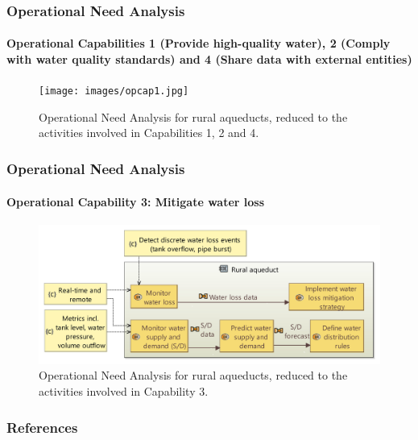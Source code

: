 \documentclass{beamer}
\begin{document}
\begin{frame}
    \frametitle{Operational Need Analysis}
    \framesubtitle{Operational Capabilities 1 (Provide high-quality water), 2 (Comply with water quality standards) and 4 (Share data with external entities)}

    \begin{figure}
        \centering
        \texttt{[image: images/opcap1.jpg]}
        \caption{Operational Need Analysis for rural aqueducts, reduced to the activities involved in Capabilities 1, 2 and 4.}
    \end{figure}
\end{frame}

\begin{frame}
    \frametitle{Operational Need Analysis}
    \framesubtitle{Operational Capability 3: Mitigate water loss}

    \begin{figure}
        \centering
        \includegraphics[width=\textwidth]{images/opcap3.jpg}
        \caption{Operational Need Analysis for rural aqueducts, reduced to the activities involved in Capability 3.}
    \end{figure}
\end{frame}

\begin{frame}
    \frametitle{References}
    
    
\end{frame}
\end{document}
